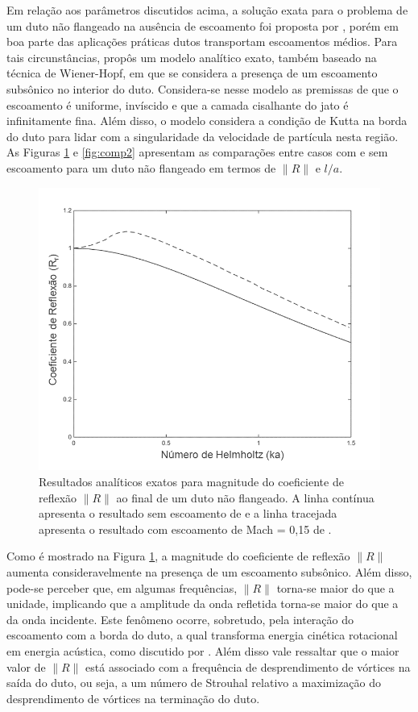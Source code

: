 Em relação aos parâmetros discutidos acima, a solução exata para o problema de um duto não flangeado na ausência de escoamento foi proposta por , porém em boa parte das aplicações práticas dutos transportam escoamentos médios. Para tais circunstâncias,  propôs um modelo analítico exato, também baseado na técnica de Wiener-Hopf, em que se considera a presença de um escoamento subsônico no interior do duto. Considera-se nesse modelo as premissas de que o escoamento é uniforme, invíscido e que a camada cisalhante do jato é infinitamente fina. Além disso, o modelo considera a condição de Kutta na borda do duto para lidar com a singularidade da velocidade de partícula nesta região. As Figuras \ref{fig:comp1} e \ref{fig:comp2} apresentam as comparações entre casos com e sem escoamento para um duto não flangeado em termos de $\|R\|$ e $l/a$.

\begin{figure}[ht!]
\centering
  \includegraphics[width=.9\linewidth]{figuras/abs_r_comparacao.png}
  \caption[Magnitudes do coeficiente de reflexão $|R|$]{Resultados analíticos exatos para magnitude do coeficiente de reflexão $\|R\|$ ao final de um duto não flangeado. A linha contínua apresenta o resultado sem escoamento de  e a linha tracejada apresenta o resultado com escoamento de Mach = 0,15 de .}
  \label{fig:comp1}
\end{figure}

Como é mostrado na Figura \ref{fig:comp1}, a magnitude do coeficiente de reflexão $\|R\|$ aumenta consideravelmente na presença de um escoamento subsônico. Além disso, pode-se perceber que, em algumas frequências, $\|R\|$ torna-se maior do que a unidade, implicando que a amplitude da onda refletida torna-se maior do que a da onda incidente. Este fenômeno ocorre, sobretudo, pela interação do escoamento com a borda do duto, a qual transforma energia cinética rotacional em energia acústica, como discutido por . Além disso vale ressaltar que o maior valor de $\|R\|$ está associado com a frequência de desprendimento de vórtices na saída do duto, ou seja, a um número de Strouhal relativo a maximização do desprendimento de vórtices na terminação do duto.  

